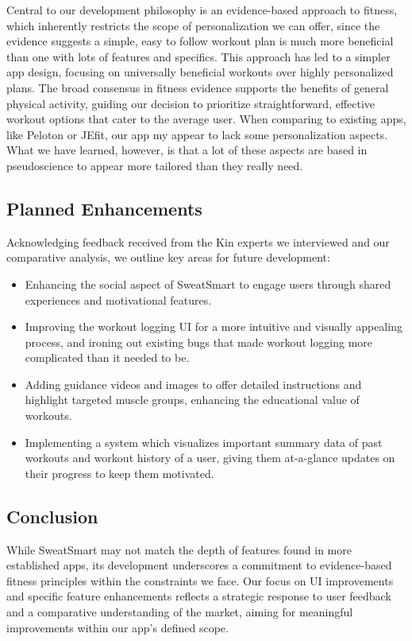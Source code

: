 \documentclass[12pt, titlepage]{article}
\begin{document}
Central to our development philosophy is an evidence-based approach to fitness, which inherently restricts the scope of personalization we can offer, since the evidence suggests a simple, easy to follow workout plan is much more beneficial than one with lots of features and specifics. This approach has led to a simpler app design, focusing on universally beneficial workouts over highly personalized plans. The broad consensus in fitness evidence supports the benefits of general physical activity, guiding our decision to prioritize straightforward, effective workout options that cater to the average user. When comparing to existing apps, like Peloton or JEfit, our app my appear to lack some personalization aspects. What we have learned, however, is that a lot of these aspects are based in pseudoscience to appear more tailored than they really need. 

\subsection{Planned Enhancements}

Acknowledging feedback received from the Kin experts we interviewed and our comparative analysis, we outline key areas for future development:
\begin{itemize}
    \item Enhancing the social aspect of SweatSmart to engage users through shared experiences and motivational features.
    \item Improving the workout logging UI for a more intuitive and visually appealing process, and ironing out existing bugs that made workout logging more complicated than it needed to be.
    \item Adding guidance videos and images to offer detailed instructions and highlight targeted muscle groups, enhancing the educational value of workouts.
    \item Implementing a system which visualizes important summary data of past workouts and workout history of a user, giving them at-a-glance updates on their progress to keep them motivated.
\end{itemize}

\subsection{Conclusion}

While SweatSmart may not match the depth of features found in more established apps, its development underscores a commitment to evidence-based fitness principles within the constraints we face. Our focus on UI improvements and specific feature enhancements reflects a strategic response to user feedback and a comparative understanding of the market, aiming for meaningful improvements within our app’s defined scope.
\end{document}
